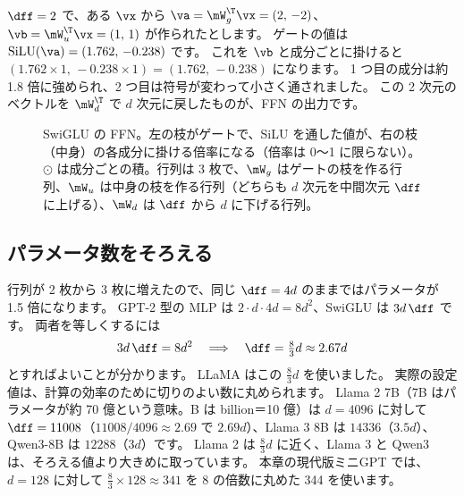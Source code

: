 \begin{example}
$\dff=2$ で、ある $\vx$ から $\va=\mW_g^\T\vx=(2,\,-2)$、$\vb=\mW_u^\T\vx=(1,\,1)$ が作られたとします。
ゲートの値は $\mathrm{SiLU}(\va)=(1.762,\,-0.238)$ です。
これを $\vb$ と成分ごとに掛けると $(1.762\times1,\,-0.238\times1)=(1.762,\,-0.238)$ になります。
1 つ目の成分は約 1.8 倍に強められ、2 つ目は符号が変わって小さく通されました。
この 2 次元のベクトルを $\mW_d^\T$ で $d$ 次元に戻したものが、FFN の出力です。
\end{example}

\begin{figure}[tbp]
\centering
{}
\caption{SwiGLU の FFN。左の枝がゲートで、SiLU を通した値が、右の枝（中身）の各成分に掛ける倍率になる（倍率は 0〜1 に限らない）。$\odot$ は成分ごとの積。行列は 3 枚で、$\mW_g$ はゲートの枝を作る行列、$\mW_u$ は中身の枝を作る行列（どちらも $d$ 次元を中間次元 $\dff$ に上げる）、$\mW_d$ は $\dff$ から $d$ に下げる行列。}
\label{fig:ma-swiglu}
\end{figure}

\subsection*{パラメータ数をそろえる}

行列が 2 枚から 3 枚に増えたので、同じ $\dff=4d$ のままではパラメータが 1.5 倍になります。
GPT-2 型の MLP は $2\cdot d\cdot4d=8d^2$、SwiGLU は $3d\,\dff$ です。
両者を等しくするには
\[
3d\,\dff=8d^2 \quad\Longrightarrow\quad \dff=\tfrac{8}{3}d\approx2.67d
\]
とすればよいことが分かります。
LLaMA はこの $\tfrac{8}{3}d$ を使いました\cite{touvron2023llama}。
実際の設定値は、計算の効率のために切りのよい数に丸められます。
Llama 2 7B（7B はパラメータが約 70 億という意味。B は billion＝10 億）は $d=4096$ に対して $\dff=11008$（$11008/4096\approx2.69$ で $2.69d$）、Llama 3 8B は $14336$（$3.5d$）、Qwen3-8B は $12288$（$3d$）です。
Llama 2 は $\tfrac83d$ に近く、Llama 3 と Qwen3 は、そろえる値より大きめに取っています。
本章の現代版ミニGPT では、$d=128$ に対して $\tfrac83\times128\approx341$ を 8 の倍数に丸めた 344 を使います。


